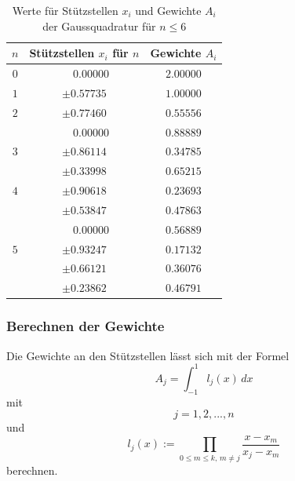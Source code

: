 \begin{table}
    \centering
    \begin{tabular}{|c|c|c|}
        \hline
        $n$ & Stützstellen $x_{i}$ für $n$ & Gewichte $A_{i}$\\
        \hline
        $0$ & $ \phantom{-} 0.00000 $ & $ 2.00000 $ \\
        \hline
        $1$ & $ \pm 0.57735 $ & $ 1.00000 $ \\
        \hline
        $2$ & $ \pm 0.77460 $ & $ 0.55556 $ \\
            & $ \phantom{-} 0.00000 $ & $ 0.88889 $ \\
        \hline
        $3$ & $ \pm 0.86114 $ & $ 0.34785 $ \\
            & $ \pm 0.33998 $ & $ 0.65215 $ \\
        \hline
        $4$ & $ \pm 0.90618 $ & $ 0.23693 $ \\
            & $ \pm 0.53847 $ & $ 0.47863 $ \\
            & $ \phantom{-} 0.00000 $ & $ 0.56889 $ \\
        \hline
        $5$ & $ \pm 0.93247 $ & $ 0.17132 $ \\
            & $ \pm 0.66121 $ & $ 0.36076 $ \\
            & $ \pm 0.23862 $ & $ 0.46791 $ \\
        \hline
    \end{tabular}
    \caption{Werte für Stützstellen $x_{i}$ und Gewichte $A_{i}$ der Gaussquadratur für $n \leq 6$
    \label{buch:table:gaussgewichtwerte}}    
\end{table}

\subsubsection{Berechnen der Gewichte}
Die Gewichte an den Stützstellen lässt sich mit der Formel
\begin{equation*}
    A_{j} = \int_{-1}^{1} l_j(x) \, dx
\end{equation*}
mit
\begin{equation*}
    j = 1, 2, ... , n
\end{equation*}
und 
\begin{equation}
    l_{j}(x) := \prod_{0 \leq m \leq k, \, m \neq j} \frac{x - x_{m}}{x_{j} - x_{m}}
\end{equation}
berechnen.

